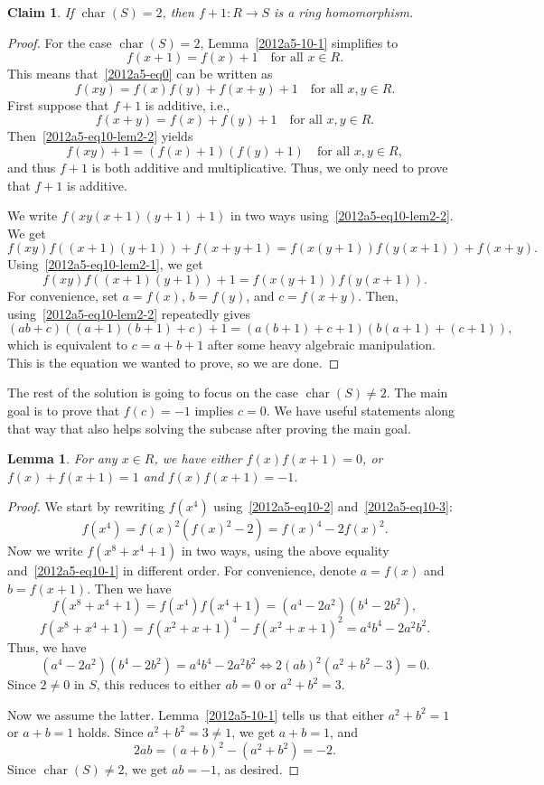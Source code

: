 \documentclass{article}
\DeclareMathOperator{\rchar}{char}
\newtheorem{lemma}{Lemma}
\newtheorem*{claim}{Claim}
\begin{document}
\begin{claim}
If $\rchar(S) = 2$, then $f + 1 : R \to S$ is a ring homomorphism.
\end{claim}
\begin{proof}
For the case $\rchar(S) = 2$, Lemma~\ref{2012a5-10-1} simplifies to
\[ f(x + 1) = f(x) + 1 \quad \text{for all } x \in R. \tag{10.L2.1}\label{2012a5-eq10-lem2-1} \]
This means that~\eqref{2012a5-eq0} can be written as
\[ f(xy) = f(x) f(y) + f(x + y) + 1 \quad \text{for all } x, y \in R. \tag{10.L2.2}\label{2012a5-eq10-lem2-2} \]
First suppose that $f + 1$ is additive, i.e.,
\[ f(x + y) = f(x) + f(y) + 1 \quad \text{for all } x, y \in R. \]
Then~\eqref{2012a5-eq10-lem2-2} yields
\[ f(xy) + 1 = (f(x) + 1)(f(y) + 1) \quad \text{for all } x, y \in R, \]
    and thus $f + 1$ is both additive and multiplicative.
Thus, we only need to prove that $f + 1$ is additive.

We write $f(xy(x + 1)(y + 1) + 1)$ in two ways using~\eqref{2012a5-eq10-lem2-2}.
We get
\[ f(xy) f((x + 1)(y + 1)) + f(x + y + 1) = f(x(y + 1)) f(y(x + 1)) + f(x + y). \]
Using~\eqref{2012a5-eq10-lem2-1}, we get
\[ f(xy) f((x + 1) (y + 1)) + 1 = f(x (y + 1)) f(y(x + 1)). \]
For convenience, set $a = f(x)$, $b = f(y)$, and $c = f(x + y)$.
Then, using~\eqref{2012a5-eq10-lem2-2} repeatedly gives
\[ (ab + c)((a + 1)(b + 1) + c) + 1 = (a(b + 1) + c + 1)(b(a + 1) + (c + 1)), \]
    which is equivalent to $c = a + b + 1$ after some heavy algebraic manipulation.
This is the equation we wanted to prove, so we are done.
\end{proof}



The rest of the solution is going to focus on the case $\rchar(S) \neq 2$.
The main goal is to prove that $f(c) = -1$ implies $c = 0$.
We have useful statements along that way that also helps solving the subcase after proving the main goal.

\begin{lemma}\label{2012a5-10-2}
For any $x \in R$, we have either $f(x) f(x + 1) = 0$, or $f(x) + f(x + 1) = 1$ and $f(x) f(x + 1) = -1$.
\end{lemma}
\begin{proof}
We start by rewriting $f(x^4)$ using~\eqref{2012a5-eq10-2} and~\eqref{2012a5-eq10-3}:
\[ f(x^4) = f(x)^2 (f(x)^2 - 2) = f(x)^4 - 2 f(x)^2. \]
Now we write $f(x^8 + x^4 + 1)$ in two ways, using the above equality and~\eqref{2012a5-eq10-1} in different order.
For convenience, denote $a = f(x)$ and $b = f(x + 1)$.
Then we have
\[ f(x^8 + x^4 + 1) = f(x^4) f(x^4 + 1) = (a^4 - 2a^2)(b^4 - 2b^2), \]
\[ f(x^8 + x^4 + 1) = f(x^2 + x + 1)^4 - f(x^2 + x + 1)^2 = a^4 b^4 - 2 a^2 b^2. \]
Thus, we have
\[ (a^4 - 2a^2)(b^4 - 2b^2) = a^4 b^4 - 2 a^2 b^2 \iff 2 (ab)^2 (a^2 + b^2 - 3) = 0. \]
Since $2 \neq 0$ in $S$, this reduces to either $ab = 0$ or $a^2 + b^2 = 3$.

Now we assume the latter.
Lemma~\ref{2012a5-10-1} tells us that either $a^2 + b^2 = 1$ or $a + b = 1$ holds.
Since $a^2 + b^2 = 3 \neq 1$, we get $a + b = 1$, and
\[ 2ab = (a + b)^2 - (a^2 + b^2) = -2. \]
Since $\rchar(S) \neq 2$, we get $ab = -1$, as desired.
\end{proof}
\end{document}
